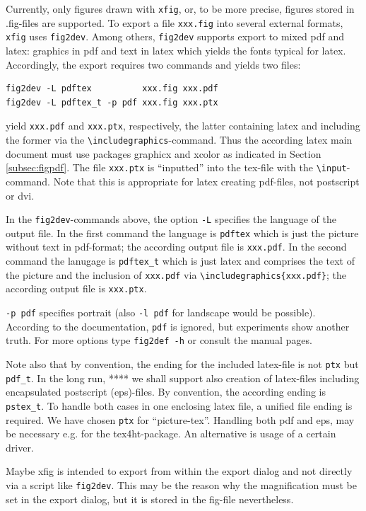 \documentclass[12pt]{article}
\begin{document}
Currently, only figures drawn with {\tt xfig}, or, to be more precise, 
figures stored in .fig-files are supported. 
To export a file {\tt xxx.fig} into several external formats, 
{\tt xfig} uses {\tt fig2dev}. 
Among others, {\tt fig2dev} supports export to mixed pdf and latex: 
graphics in pdf and text in latex which yields the fonts typical for latex. 
Accordingly, the export requires two commands and yields two files: 
%
\begin{verbatim}
fig2dev -L pdftex          xxx.fig xxx.pdf   
fig2dev -L pdftex_t -p pdf xxx.fig xxx.ptx
\end{verbatim}
%
yield {\tt xxx.pdf} and {\tt xxx.ptx}, respectively, 
the latter containing latex and including the former via the 
{\tt\textbackslash includegraphics}-command. 
Thus the according latex main document must use packages graphicx and xcolor 
as indicated in Section \ref{subsec:figpdf}. 
The file {\tt xxx.ptx} is ``inputted'' into the tex-file 
with the {\tt\textbackslash input}-command. 
Note that this is appropriate for latex creating pdf-files, 
not postscript or dvi. 

In the {\tt fig2dev}-commands above, 
the option {\tt -L} specifies the language of the output file. 
In the first command the language is {\tt pdftex} 
which is just the picture without text in pdf-format; 
the according output file is  {\tt xxx.pdf}. 
In the second command the lanugage is {\tt pdftex\_t} 
which is just latex and 
comprises the text of the picture and the inclusion of {\tt xxx.pdf}
via {\tt\textbackslash includegraphics\{xxx.pdf\}}; 
the according output file is {\tt xxx.ptx}. 

{\tt -p pdf} specifies portrait 
(also {\tt -l pdf} for landscape would be possible). 
According to the documentation, {\tt pdf} is ignored, 
but experiments show another truth. 
For more options type {\tt fig2def -h} or consult the manual pages. 


Note also that by convention, the ending for the included latex-file 
is not {\tt ptx} but {\tt pdf\_t}. 
In the long run, **** we shall support also creation of latex-files 
including encapsulated postscript (eps)-files. 
By convention, the according ending is {\tt pstex\_t}. 
To handle both cases in one enclosing latex file, 
a unified file ending is required. 
We have chosen {\tt ptx} for ``picture-tex''. 
Handling both pdf and eps, may be necessary e.g. for the tex4ht-package. 
An alternative is usage of a certain driver. 


Maybe xfig is intended to export from within the export dialog 
and not directly via a script like {\tt fig2dev}. 
This may be the reason 
why the magnification must be set in the export dialog, 
but it is stored in the fig-file nevertheless. 
\end{document}

